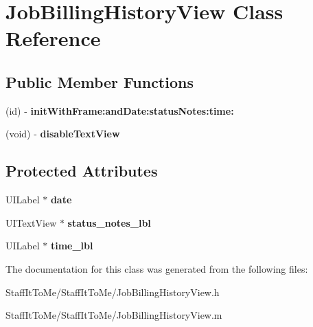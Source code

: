 \hypertarget{interface_job_billing_history_view}{
\section{\-Job\-Billing\-History\-View \-Class \-Reference}
\label{interface_job_billing_history_view}
}
\subsection*{\-Public \-Member \-Functions}
\begin{DoxyCompactItemize}
\item 
\hypertarget{interface_job_billing_history_view_a8eaf76187744b774604ec7244483f05c}{
(id) -\/ {\bfseries init\-With\-Frame\-:and\-Date\-:status\-Notes\-:time\-:}}
\label{interface_job_billing_history_view_a8eaf76187744b774604ec7244483f05c}

\item 
\hypertarget{interface_job_billing_history_view_a3a01f135a685fff6a74abe88ca527fdb}{
(void) -\/ {\bfseries disable\-Text\-View}}
\label{interface_job_billing_history_view_a3a01f135a685fff6a74abe88ca527fdb}

\end{DoxyCompactItemize}
\subsection*{\-Protected \-Attributes}
\begin{DoxyCompactItemize}
\item 
\hypertarget{interface_job_billing_history_view_a426504713029e8a72d11af4d02661c4b}{
\-U\-I\-Label $\ast$ {\bfseries date}}
\label{interface_job_billing_history_view_a426504713029e8a72d11af4d02661c4b}

\item 
\hypertarget{interface_job_billing_history_view_a89521e447b27febbbb990379fd136a26}{
\-U\-I\-Text\-View $\ast$ {\bfseries status\-\_\-notes\-\_\-lbl}}
\label{interface_job_billing_history_view_a89521e447b27febbbb990379fd136a26}

\item 
\hypertarget{interface_job_billing_history_view_a992b83ceb1d622aad6ae508b6c549459}{
\-U\-I\-Label $\ast$ {\bfseries time\-\_\-lbl}}
\label{interface_job_billing_history_view_a992b83ceb1d622aad6ae508b6c549459}

\end{DoxyCompactItemize}


\-The documentation for this class was generated from the following files\-:\begin{DoxyCompactItemize}
\item 
\-Staff\-It\-To\-Me/\-Staff\-It\-To\-Me/\-Job\-Billing\-History\-View.\-h\item 
\-Staff\-It\-To\-Me/\-Staff\-It\-To\-Me/\-Job\-Billing\-History\-View.\-m\end{DoxyCompactItemize}
